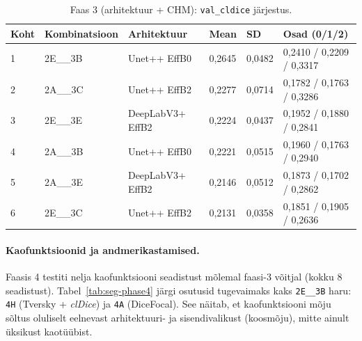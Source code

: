 \begin{table}[h!]
\centering
\caption{Faas 3 (arhitektuur + CHM): \texttt{val\_cldice} järjestus.}
\label{tab:seg-phase3}
\begin{tabular}{llllll}
\hline
\textbf{Koht} & \textbf{Kombinatsioon} & \textbf{Arhitektuur} & \textbf{Mean} & \textbf{SD} & \textbf{Osad (0/1/2)} \\
\hline
1 & 2E\_\_3B & Unet++ EffB0    & 0,2645 & 0,0482 & 0,2410 / 0,2209 / 0,3317 \\
2 & 2A\_\_3C & Unet++ EffB2    & 0,2277 & 0,0714 & 0,1782 / 0,1763 / 0,3286 \\
3 & 2E\_\_3E & DeepLabV3+ EffB2& 0,2224 & 0,0437 & 0,1952 / 0,1880 / 0,2841 \\
4 & 2A\_\_3B & Unet++ EffB0    & 0,2221 & 0,0515 & 0,1960 / 0,1763 / 0,2940 \\
5 & 2A\_\_3E & DeepLabV3+ EffB2& 0,2146 & 0,0512 & 0,1873 / 0,1702 / 0,2862 \\
6 & 2E\_\_3C & Unet++ EffB2    & 0,2131 & 0,0358 & 0,1851 / 0,1905 / 0,2636 \\
\hline
\end{tabular}
\end{table}

\paragraph{Kaofunktsioonid ja andmerikastamised.}

Faasis 4 testiti nelja kaofunktsiooni seadistust mõlemal faasi-3 võitjal (kokku 8 seadistust). Tabel~\ref{tab:seg-phase4} järgi osutusid tugevaimaks kaks \texttt{2E\_\_3B} haru: \texttt{4H} (Tversky + \textit{clDice}) ja \texttt{4A} (DiceFocal). See näitab, et kaofunktsiooni mõju sõltus oluliselt eelnevast arhitektuuri- ja sisendivalikust (koosmõju), mitte ainult üksikust kaotüübist.

